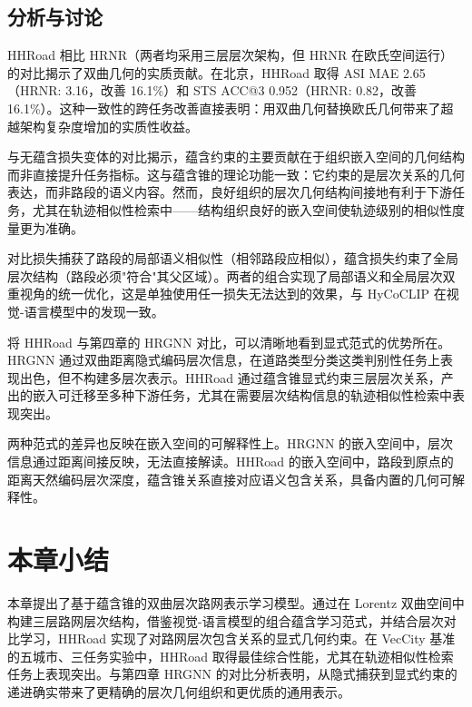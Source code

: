 \subsection{分析与讨论}

HHRoad 相比 HRNR（两者均采用三层层次架构，但 HRNR 在欧氏空间运行）的对比揭示了双曲几何的实质贡献。在北京，HHRoad 取得 ASI MAE 2.65（HRNR: 3.16，改善 16.1\%）和 STS ACC@3 0.952（HRNR: 0.82，改善 16.1\%）。这种一致性的跨任务改善直接表明：用双曲几何替换欧氏几何带来了超越架构复杂度增加的实质性收益。

与无蕴含损失变体的对比揭示，蕴含约束的主要贡献在于组织嵌入空间的几何结构而非直接提升任务指标。这与蕴含锥的理论功能一致：它约束的是层次关系的几何表达，而非路段的语义内容。然而，良好组织的层次几何结构间接地有利于下游任务，尤其在轨迹相似性检索中——结构组织良好的嵌入空间使轨迹级别的相似性度量更为准确。

对比损失捕获了路段的局部语义相似性（相邻路段应相似），蕴含损失约束了全局层次结构（路段必须"符合"其父区域）。两者的组合实现了局部语义和全局层次双重视角的统一优化，这是单独使用任一损失无法达到的效果，与 HyCoCLIP 在视觉-语言模型中的发现一致。

将 HHRoad 与第四章的 HRGNN 对比，可以清晰地看到显式范式的优势所在。HRGNN 通过双曲距离隐式编码层次信息，在道路类型分类这类判别性任务上表现出色，但不构建多层次表示。HHRoad 通过蕴含锥显式约束三层层次关系，产出的嵌入可迁移至多种下游任务，尤其在需要层次结构信息的轨迹相似性检索中表现突出。

两种范式的差异也反映在嵌入空间的可解释性上。HRGNN 的嵌入空间中，层次信息通过距离间接反映，无法直接解读。HHRoad 的嵌入空间中，路段到原点的距离天然编码层次深度，蕴含锥关系直接对应语义包含关系，具备内置的几何可解释性。

\section{本章小结}

本章提出了基于蕴含锥的双曲层次路网表示学习模型。通过在 Lorentz 双曲空间中构建三层路网层次结构，借鉴视觉-语言模型的组合蕴含学习范式，并结合层次对比学习，HHRoad 实现了对路网层次包含关系的显式几何约束。在 VecCity 基准的五城市、三任务实验中，HHRoad 取得最佳综合性能，尤其在轨迹相似性检索任务上表现突出。与第四章 HRGNN 的对比分析表明，从隐式捕获到显式约束的递进确实带来了更精确的层次几何组织和更优质的通用表示。
